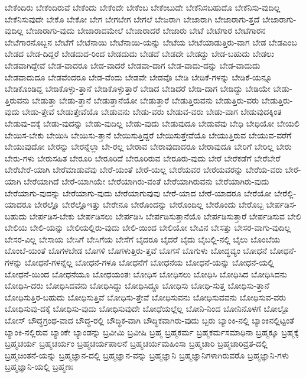 {ಬೇಕೆಂದಿರು
ಬೇಕೆಂದಿರುವೆ
ಬೇಕೆಂದು
ಬೇಕೆಂದೇ
ಬೇಕೆಂಬ
ಬೇಕೆಂಬುದೇ
ಬೇಕೆನಿಸಬಹುದೊ
ಬೇಕೆನಿಸು-ವುದಿಲ್ಲ
ಬೇಕೆನಿಸುವುದೇ
ಬೇಕೊ
ಬೇಕೋ
ಬೇಗ
ಬೇಗಬೇಗ
ಬೇಗಲೆ
ಬೇಜರಾಗಿ
ಬೇಜಾರಾಗಿ
ಬೇಜಾರಾಗು-ತ್ತದೆ
ಬೇಜಾರಾಗು-ವುದಿಲ್ಲ
ಬೇಜಾರಾಗು-ವುದು
ಬೇಜಾರಾದಮೇಲೆ
ಬೇಜಾರಾದರೆ
ಬೇಜಾರು
ಬೇಟೆ
ಬೇಟೆಗಾರ
ಬೇಟೆಗಾರನ
ಬೇಟೆಗಾರನೊಬ್ಬನ
ಬೇಟೆಗೆ
ಬೇಟೆನಾಯಿ
ಬೇಟೆನಾಯಿ-ಯನ್ನು
ಬೇಟೆಯ
ಬೇಟೆಯಾಡುತ್ತಿರು-ವಾಗ
ಬೇಡ
ಬೇಡಎಂಬ
ಬೇಡದ
ಬೇಡ-ದಿದ್ದರೆ
ಬೇಡದುದ-ರಿಂದ
ಬೇಡದುದು
ಬೇಡದೆ
ಬೇಡದೇ
ಬೇಡದ್ದು
ಬೇಡ-ಬಹುದು
ಬೇಡಲು
ಬೇಡವಾಗಿದ್ದೇವೆ
ಬೇಡ-ವಾದರೂ
ಬೇಡ-ವಾದರೆ
ಬೇಡವಾ-ದಾಗ
ಬೇಡ-ವಾದು-ದನ್ನು
ಬೇಡ-ವಾದುದು
ಬೇಡವಾದುದೂ
ಬೇಡವೆಂದರೂ
ಬೇಡ-ವೆಂದು
ಬೇಡವೇ
ಬೇಡವೊ
ಬೇಡಿ
ಬೇಡಿಕೆ-ಗಳನ್ನು
ಬೇಡಿಕೆ-ಯನ್ನೂ
ಬೇಡಿಕೊಂಡಿದ್ದ
ಬೇಡಿಕೊಳ್ಳು-ತ್ತಾನೆ
ಬೇಡಿಕೊಳ್ಳುತ್ತಾರೆ
ಬೇಡಿದ
ಬೇಡಿದರೆ
ಬೇಡಿ-ದಾಗ
ಬೇಡಿದ್ದು
ಬೇಡಿಯೇ
ಬೇಡು-ತ್ತಿರುವನು
ಬೇಡುತ್ತಾ
ಬೇಡು-ತ್ತಾನೆ
ಬೇಡುತ್ತಾನೆಯೋ
ಬೇಡುತ್ತಾರೆ
ಬೇಡುತ್ತಿರುವನು
ಬೇಡುತ್ತಿರು-ವರು
ಬೇಡುತ್ತಿರು-ವುದು
ಬೇಡು-ತ್ತೇವೆ
ಬೇಡುತ್ತೇವೆಯೊ
ಬೇಡುವನು
ಬೇಡು-ವರು
ಬೇಡುವ-ವರು
ಬೇಡು-ವಾಗ
ಬೇಡುವುದಕ್ಕಿಂತ
ಬೇಡುವು-ದಕ್ಕೆ
ಬೇಡು-ವುದನ್ನು
ಬೇಡು-ವುದಿಲ್ಲ
ಬೇಡು-ವುದು
ಬೇಡುವುದೂ
ಬೇಡುವೆವು
ಬೇಧಿ
ಬೇಧಿಯೋ
ಬೇಯಲಿ
ಬೇಯಿಸ-ಬೇಕು
ಬೇಯಿಸಿ
ಬೇಯಿಸು-ತ್ತಾನೆ
ಬೇಯಿಸುತ್ತಿದ್ದರೆ
ಬೇಯಿಸುತ್ತೇವೆಯೊ
ಬೇಯುತ್ತಿರುವ
ಬೇಯುವ-ವರೆಗೆ
ಬೇಯುವುದೋ
ಬೇರನ್ನು
ಬೇರನ್ನೆಲ್ಲಾ
ಬೇ-ರಲ್ಲ
ಬೇರಾವ
ಬೇರಾವುದಾದರೂ
ಬೇರಾವುದೂ
ಬೇರಿಗೆ
ಬೇರಿಲ್ಲ
ಬೇರು
ಬೇರು-ಗಳು
ಬೇರುಸಹಿತ
ಬೇರೂರಿ
ಬೇರೂರಿದೆ
ಬೇರೂರಿರುವ
ಬೇರೂರು-ವುದು
ಬೇರೆ
ಬೇರೆಕಡೆಗೆ
ಬೇರೆಬೇರೆ
ಬೇರೆಬೇರೆ-ಯಾಗಿ
ಬೇರೆಮಾಡುವೆವು
ಬೇರೆ-ಯಂತೆ
ಬೇರೆ-ಯಲ್ಲ
ಬೇರೆಯವರ
ಬೇರೆಯವರನ್ನು
ಬೇರೆಯ-ವರು
ಬೇರೆ-ಯಾಗಿ
ಬೇರೆಯಾಗಿದೆ
ಬೇರೆ-ಯಾಗಿಯೇ
ಬೇರೆಯಾಗಿರು-ವಂತೆ
ಬೇರೆಯಾಗಿರುವನು
ಬೇರೆಯಾಗಿರು-ವುದು
ಬೇರೆಯಾಗು-ವುದನ್ನು
ಬೇರೆಯಾಗು-ವುದು
ಬೇರೆಯಾಗುವುವು
ಬೇರೆ-ಯಾದ
ಬೇರೆ-ಯಾದರೂ
ಬೇರೆಯೋ
ಬೇರೆಲ್ಲಿ-ಯಾದರೂ
ಬೇರೆಲ್ಲೊ
ಬೇರೆಲ್ಲೊಇತ್ತು
ಬೇರೇನೂ
ಬೇರೊಂದನ್ನು
ಬೇರೊಂದಿಲ್ಲ
ಬೇರೊಂದು
ಬೇರೊಬ್ಬ
ಬೇರ್ಪಡಿಸ-ಬಹುದು
ಬೇರ್ಪಡಿಸ-ಬೇಕು
ಬೇರ್ಪಡಿಸಲು
ಬೇರ್ಪಡಿಸಿ
ಬೇರ್ಪಡಿಸುತ್ತಾನೆಯೊ
ಬೇರ್ಪಡಿಸುತ್ತಾರೆ
ಬೇರ್ಪಡಿಸುವ
ಬೇಲಿ
ಬೇಲಿಯ
ಬೇಲಿ-ಯನ್ನು
ಬೇಲಿಯಲ್ಲಿರು-ವುದು
ಬೇಲಿ-ಯಿಂದ
ಬೇಲಿಯೋ
ಬೇವಿನ
ಬೇಸತ್ತು
ಬೇಸರ-ವಾಗು-ವುದಿಲ್ಲ
ಬೇಸರ-ವಿಲ್ಲ
ಬೇಸಾಯ
ಬೇಸಿಗೆ
ಬೇಸಿಗೆಯ
ಬೇಸೆಗೆ
ಬೈದರೂ
ಬೈದರೆ
ಬೈದು
ಬೈಬಲ್ಲಿ-ನಲ್ಲಿ
ಬೈಲು
ಬೊಂಬೆಯ
ಬೊಂಬೆ-ಯಂತೆ
ಬೊಗಳಬೇಡ
ಬೊಗಳಿ
ಬೊಗಳುತ್ತಿರು-ತ್ತವೆ
ಬೊಗಸೆ
ಬೊಗುಳು
ಬೋದ್ಧವ್ಯಂ
ಬೋಧನೆ
ಬೋಧನೆ-ಗಳನ್ನು
ಬೋಧನೆ-ಗಳನ್ನೆಲ್ಲ
ಬೋಧನೆ-ಗಳೂ
ಬೋಧನೆಗೆ
ಬೋಧನೆಯ
ಬೋಧನೆ-ಯನ್ನು
ಬೋಧನೆ-ಯಲ್ಲಿ
ಬೋಧನೆ-ಯಿಂದ
ಬೋಧನೆಯೂ
ಬೋಧಯಂತಃ
ಬೋಧಿಸ
ಬೋಧಿಸಲು
ಬೋಧಿಸಿ
ಬೋಧಿಸಿದ
ಬೋಧಿಸಿದನು
ಬೋಧಿಸಿ-ದರು
ಬೋಧಿಸಿದವನು
ಬೋಧಿಸಿದ್ದು
ಬೋಧಿಸಿದ್ದೂ
ಬೋಧಿಸು
ಬೋಧಿ-ಸುತ್ತ
ಬೋಧಿಸು-ತ್ತಾನೆ
ಬೋಧಿಸುತ್ತಿರ-ಬಹುದು
ಬೋಧಿಸುತ್ತಿವೆ
ಬೋಧಿಸು-ತ್ತೇವೆ
ಬೋಧಿಸುವನು
ಬೋಧಿಸುವವನು
ಬೋಧಿಸುವ-ವರು
ಬೋಧಿಸುವು-ದಕ್ಕೆ
ಬೋಧಿಸು-ವುದು
ಬೋಧಿಸುವುದೇ
ಬೋಧೆಯಲ್ಲೆಲ್ಲ
ಬೋನಿ-ನಿಂದ
ಬೋನಿನೊಳಗೆ
ಬೋಲ್ಟೊ
ಬೋಸ್
ಬೌದ್ಧಗ್ರಂಥ-ವಾದ
ಬೌದ್ಧ-ರಲ್ಲಿ
ಬೌದ್ಧಿಕ-ವಾಗಿ
ಬೌದ್ಧಿಕವಾಗಿರು-ವುದು
ಬ್ಬರು
ಬ್ಯಾಂಕಿ-ನಲ್ಲಿ
ಬ್ಯಾಂಕಿನಲ್ಲಿಟ್ಟಂತೆ
ಬ್ಯಾಂಕಿ-ನಲ್ಲಿರುವ
ಬ್ಯಾಂಕೇ
ಬ್ಯಾಂಡನ್ನು
ಬ್ರವೀಮಿ
ಬ್ರವೀಷಿ
ಬ್ರಹ್ಮ
ಬ್ರಹ್ಮಕರ್ಮ
ಬ್ರಹ್ಮಕರ್ಮಸಮಾಧಿನಾ
ಬ್ರಹ್ಮಕ್ಕೂ
ಬ್ರಹ್ಮಕ್ಕೆ
ಬ್ರಹ್ಮಚರ್ಯ
ಬ್ರಹ್ಮಚರ್ಯಂ
ಬ್ರಹ್ಮಚರ್ಯಪಾಲನೆ
ಬ್ರಹ್ಮಚರ್ಯಮಹಿಂಸಾ
ಬ್ರಹ್ಮಚಾರಿ
ಬ್ರಹ್ಮಚಾರಿವ್ರತ-ದಲ್ಲಿ
ಬ್ರಹ್ಮಚಿಂತನೆ-ಯನ್ನು
ಬ್ರಹ್ಮಜ್ಞಾನ-ದಲ್ಲಿ
ಬ್ರಹ್ಮಜ್ಞಾನ-ವನ್ನು
ಬ್ರಹ್ಮಜ್ಞಾನಿ
ಬ್ರಹ್ಮಜ್ಞಾನಿಗಳಾಗಿರುವರೊ
ಬ್ರಹ್ಮಜ್ಞಾನಿ-ಗಳು
ಬ್ರಹ್ಮಜ್ಞಾನಿ-ಯಲ್ಲಿ
ಬ್ರಹ್ಮಣಃ
}
